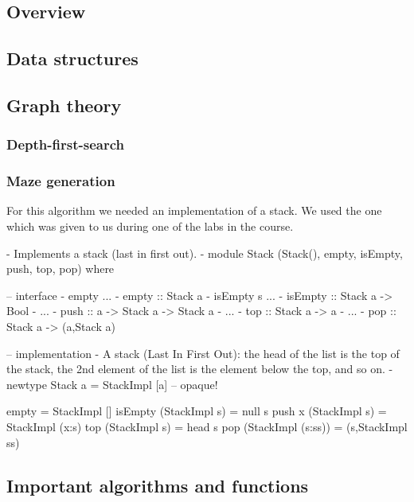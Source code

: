 \documentclass[12pt, a4paper]{article}
\begin{document}
\subsection{Overview}

\subsection{Data structures}

\subsection{Graph theory}

\subsubsection{Depth-first-search}

\subsubsection{Maze generation}

For this algorithm we needed an implementation of a stack. We used the one which was given to us during one of the labs in the course. 

\begin{code}

{- Implements a stack (last in first out). -}
module Stack (Stack(), empty, isEmpty, push, top, pop) where

-- interface
{- empty ... -}
empty :: Stack a
{- isEmpty s ... -}
isEmpty :: Stack a -> Bool
{- ... -}
push :: a -> Stack a -> Stack a
{- ... -}
top :: Stack a -> a
{- ... -}
pop :: Stack a -> (a,Stack a)


-- implementation
{- A stack (Last In First Out): the head of the list is
    the top of the stack, the 2nd element of the list is
    the element below the top, and so on.
-}
newtype Stack a = StackImpl [a] -- opaque!

empty = StackImpl []
isEmpty (StackImpl s) = null s
push x (StackImpl s) = StackImpl (x:s)
top (StackImpl s) = head s
pop (StackImpl (s:ss)) = (s,StackImpl ss)

\end{code}

\subsection{Important algorithms and functions}
\end{document}
